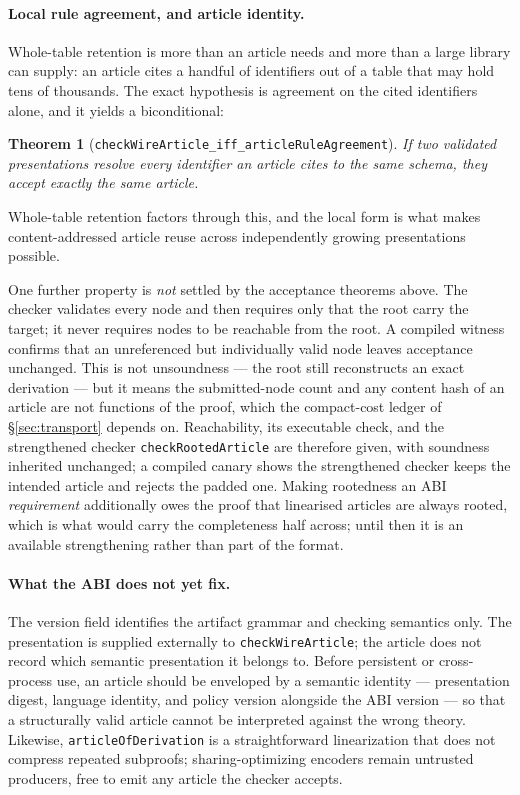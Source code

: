 \documentclass[]{article}
\newtheorem{theorem}{Theorem}
\theoremstyle{remark}
\newcommand{\code}[1]{\texttt{#1}}
\begin{document}
\paragraph{Local rule agreement, and article identity.}
Whole-table retention is more than an article needs and more than a large
library can supply: an article cites a handful of identifiers out of a table
that may hold tens of thousands.  The exact hypothesis is agreement on the
cited identifiers alone, and it yields a biconditional:

\begin{theorem}[\code{checkWireArticle\_iff\_articleRuleAgreement}]
If two validated presentations resolve every identifier an article cites to
the same schema, they accept exactly the same article.
\end{theorem}

Whole-table retention factors through this, and the local form is what makes
content-addressed article reuse across independently growing presentations
possible.

One further property is \emph{not} settled by the acceptance theorems above.
The checker validates every node and then requires only that the root carry
the target; it never requires nodes to be reachable from the root.  A
compiled witness confirms that an unreferenced but individually valid node
leaves acceptance unchanged.  This is not unsoundness --- the root still
reconstructs an exact derivation --- but it means the submitted-node count
and any content hash of an article are not functions of the proof, which the
compact-cost ledger of \S\ref{sec:transport} depends on.  Reachability, its
executable check, and the strengthened checker \code{checkRootedArticle} are
therefore given, with soundness inherited unchanged; a compiled canary shows
the strengthened checker keeps the intended article and rejects the padded
one.  Making rootedness an ABI \emph{requirement} additionally owes the
proof that linearised articles are always rooted, which is what would carry
the completeness half across; until then it is an available strengthening
rather than part of the format.

\paragraph{What the ABI does not yet fix.}
The version field identifies the artifact grammar and checking semantics
only.  The presentation is supplied externally to \code{checkWireArticle};
the article does not record which semantic presentation it belongs to.
Before persistent or cross-process use, an article should be enveloped by a
semantic identity --- presentation digest, language identity, and policy
version alongside the ABI version --- so that a structurally valid article
cannot be interpreted against the wrong theory.  Likewise,
\code{articleOfDerivation} is a straightforward linearization that does not
compress repeated subproofs; sharing-optimizing encoders remain untrusted
producers, free to emit any article the checker accepts.
\end{document}
